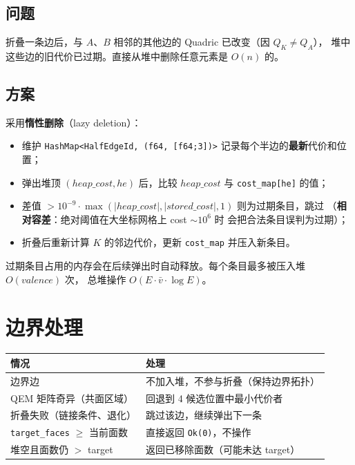 \documentclass[11pt,a4paper]{article}
\begin{document}
\subsection{问题}

折叠一条边后，与 $A$、$B$ 相邻的其他边的 Quadric 已改变（因 $Q_K \neq Q_A$），
堆中这些边的旧代价已过期。直接从堆中删除任意元素是 $O(n)$ 的。

\subsection{方案}

采用\textbf{惰性删除}（lazy deletion）：
\begin{itemize}
  \item 维护 \texttt{HashMap<HalfEdgeId, (f64, [f64;3])>} 记录每个半边的\textbf{最新}代价和位置；
  \item 弹出堆顶 $(heap\_cost, he)$ 后，比较 $heap\_cost$ 与 \texttt{cost\_map[he]} 的值；
  \item 差值 $> 10^{-9} \cdot \max(|heap\_cost|, |stored\_cost|, 1)$ 则为过期条目，跳过
        （\textbf{相对容差}：绝对阈值在大坐标网格上 cost $\sim 10^6$ 时
        会把合法条目误判为过期）；
  \item 折叠后重新计算 $K$ 的邻边代价，更新 \texttt{cost\_map} 并压入新条目。
\end{itemize}

过期条目占用的内存会在后续弹出时自动释放。每个条目最多被压入堆 $O(valence)$ 次，
总堆操作 $O(E \cdot \bar{v} \cdot \log E)$。

\section{边界处理}

\begin{center}
\renewcommand{\arraystretch}{1.18}
\begin{tabular}{@{}ll@{}}
  \toprule
  \textbf{情况} & \textbf{处理} \\
  \midrule
  边界边 & 不加入堆，不参与折叠（保持边界拓扑） \\
  QEM 矩阵奇异（共面区域） & 回退到 4 候选位置中最小代价者 \\
  折叠失败（链接条件、退化） & 跳过该边，继续弹出下一条 \\
  \texttt{target\_faces} $\ge$ 当前面数 & 直接返回 \texttt{Ok(0)}，不操作 \\
  堆空且面数仍 $>$ target & 返回已移除面数（可能未达 target） \\
  \bottomrule
\end{tabular}
\end{center}
\end{document}
